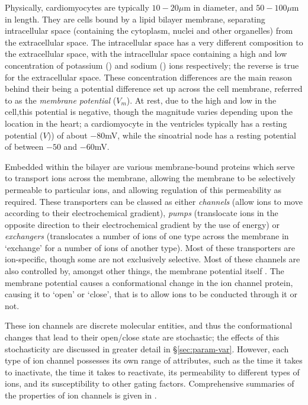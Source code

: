 \documentclass[../thesis-main.tex]{subfiles}
\begin{document}
 Physically, cardiomyocytes are typically $10-20\mu$m in diameter, and $50-100\mu$m in length. They are cells bound by a lipid bilayer membrane, separating intracellular space (containing the cytoplasm, nuclei and other organelles) from the extracellular space. The intracellular space has a very different composition to the extracellular space, with the intracellular space containing a high and low concentration of potassium (\K) and sodium (\na) ions respectively; the reverse is true for the extracellular space. These concentration differences are the main reason behind their being a potential difference set up across the cell membrane, referred to as the \emph{membrane potential} ($V_m$). At rest, due to the high \K{} and low \na{} in the cell,this potential is negative, though the magnitude varies depending upon the location in the heart; a cardiomyocyte in the ventricles typically has a resting potential ($V$)) of about $-80$mV, while the sinoatrial node has a resting potential of between $-50$ and $-60$mV.
 
 Embedded within the bilayer are various membrane-bound proteins which serve to transport ions across the membrane, allowing the membrane to be selectively permeable to particular ions, and allowing regulation of this permeability as required. These transporters can be classed as either \emph{channels} (allow ions to move according to their electrochemical gradient), \emph{pumps} (translocate ions in the opposite direction to their electrochemical gradient by the use of energy) or \emph{exchangers} (translocates a number of ions of one type across the membrane in `exchange' for a number of ions of another type). Most of these transporters are ion-specific, though some are not exclusively selective. Most of these channels are also controlled by, amongst other things, the membrane potential itself \citep{Bezanilla2000}. The membrane potential causes a conformational change in the ion channel protein, causing it to `open' or `close', that is to allow ions to be conducted through it or not.
 
 These ion channels are discrete molecular entities, and thus the conformational changes that lead to their open/close state are stochastic; the effects of this stochasticity are discussed in greater detail in \S\ref{sec:param-var}. However, each type of ion channel possesses its own range of attributes, such as the time it takes to inactivate, the time it takes to reactivate, its permeability to different types of ions, and its susceptibility to other gating factors. Comprehensive summaries of the properties of ion channels is given in \citet{Carmeliet2002, Roden2002}.
 
\end{document}
